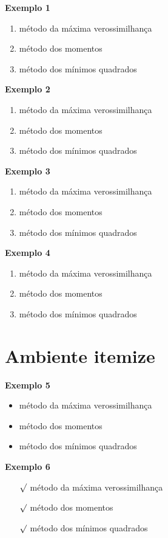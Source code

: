 \documentclass[12pt]{article}
\begin{document}
\noindent \textbf{Exemplo 1}

\begin{enumerate}
    \item método da máxima verossimilhança
    \item método dos momentos
    \item método dos mínimos quadrados
\end{enumerate}


\noindent \textbf{Exemplo 2}
\begin{enumerate} [{exemplo} a)]
    \item método da máxima verossimilhança
    \item método dos momentos
    \item método dos mínimos quadrados
\end{enumerate}


\noindent \textbf{Exemplo 3}
\begin{enumerate} [{A}-1)]
    \item método da máxima verossimilhança
    \item método dos momentos
    \item método dos mínimos quadrados
\end{enumerate}


\noindent \textbf{Exemplo 4}
\begin{enumerate} [A]
    \item método da máxima verossimilhança
    \item método dos momentos
    \item método dos mínimos quadrados
\end{enumerate}


\section{Ambiente itemize}

\noindent \textbf{Exemplo 5}
\begin{itemize}
    \item método da máxima verossimilhança
    \item método dos momentos
    \item método dos mínimos quadrados
\end{itemize}

\noindent \textbf{Exemplo 6}
\begin{itemize}
    \item[$\surd$] método da máxima verossimilhança
    \item[$\surd$] método dos momentos
    \item[$\surd$] método dos mínimos quadrados
\end{itemize}
\end{document}
